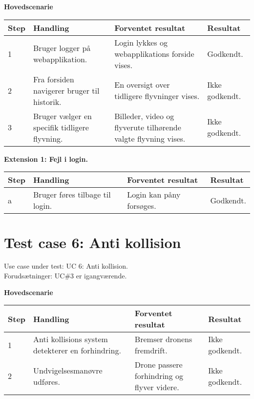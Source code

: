\textbf{Hovedscenarie}
\begin{table}[H]
	\centering
		\begin{tabular}{|l|p{5 cm}|p{5 cm}|p{2.5 cm}|} 
		\hline
			\textbf{Step} & \textbf{Handling} & \textbf{Forventet resultat} & \textbf{Resultat} \\ \hline
			1 & Bruger logger på \newline webapplikation. & Login lykkes og webapplikations forside vises. & Godkendt.  \\ \hline
			2 & Fra forsiden navigerer \newline bruger til historik. & En oversigt over tidligere \newline flyvninger vises. & Ikke godkendt. \\ \hline
			3 & Bruger vælger en specifik \newline tidligere flyvning. &  Billeder, video og flyverute \newline tilhørende valgte flyvning \newline vises. &  Ikke godkendt. \\ \hline			
		\end{tabular}
\end{table}

\textbf{Extension 1: Fejl i login.}
\begin{table}[H]
	\centering
		\begin{tabular}{|l|p{5 cm}|p{5 cm}|p{2.5 cm}|} 
		\hline
			\textbf{Step} & \textbf{Handling} & \textbf{Forventet resultat} & \textbf{Resultat} \\ \hline
			a & Bruger føres tilbage til login. & Login kan påny forsøges. & Godkendt. \\ \hline
		\end{tabular}
\end{table}

\section{Test case 6: Anti kollision}
Use case under test: UC 6: Anti kollision.\\
Forudsætninger:	UC\#3 er igangværende.

\textbf{Hovedscenarie}
\begin{table}[H]
	\centering
		\begin{tabular}{|l|p{5 cm}|p{5 cm}|p{2.5 cm}|} 
		\hline
			\textbf{Step} & \textbf{Handling} & \textbf{Forventet resultat} & \textbf{Resultat} \\ \hline
			1 & Anti kollisions system \newline detekterer en forhindring. & Bremser dronens fremdrift. & Ikke godkendt. \\ \hline
			2 & Undvigelsesmanøvre udføres. & Drone passere forhindring og flyver videre. & Ikke godkendt.\\ \hline			
		\end{tabular}
\end{table}

